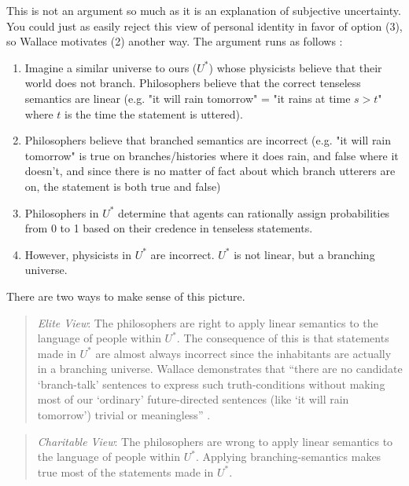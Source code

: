 \documentclass{article}
\begin{document}
This is not an argument so much as it is an explanation of subjective uncertainty. You could just as easily reject this view of personal identity in favor of option (3), so Wallace motivates (2) another way. The argument runs as follows \parencite[9-11]{wallaceLanguageUseBranching2005} :
\begin{enumerate}
	\item Imagine a similar universe to ours ($U^*$) whose physicists believe that their world does not branch. Philosophers believe that the correct tenseless semantics are linear (e.g. "it will rain tomorrow" = "it rains at time $s>t$" where $t$ is the time the statement is uttered). 
	\item Philosophers believe that branched semantics are incorrect (e.g. "it will rain tomorrow" is true on branches/histories where it does rain, and false where it doesn't, and since there is no matter of fact about which branch utterers are on, the statement is both true and false)
	\item Philosophers in $U^*$ determine that agents can rationally assign probabilities from 0 to 1 based on their credence in tenseless statements.
	\item However, physicists in $U^*$ are incorrect. $U^*$ is not linear, but a branching universe.
\end{enumerate}
There are two ways to make sense of this picture.
\begin{quote}
	\emph{Elite View}: The philosophers are right to apply linear semantics to the language of people within $U^*$. The consequence of this is that statements made in $U^*$ are almost always incorrect since the inhabitants are actually in a branching universe. Wallace demonstrates that ``there are no candidate ‘branch-talk’ sentences to express such truth-conditions without making most of our ‘ordinary’ future-directed sentences (like ‘it will rain tomorrow’) trivial or meaningless'' \parencite[9]{wallaceLanguageUseBranching2005}.
\end{quote}

\begin{quote}
	\emph{Charitable View}: The philosophers are wrong to apply linear semantics to the language of people within $U^*$. Applying branching-semantics makes true most of the statements made in $U^*$.
\end{quote}
\end{document}
